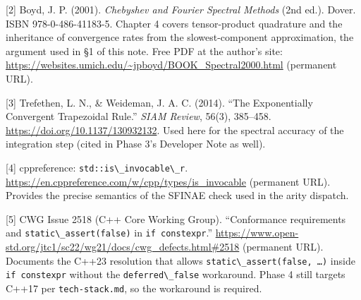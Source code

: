 {[}2{]} Boyd, J. P. (2001). \emph{Chebyshev and Fourier Spectral
Methods} (2nd ed.). Dover. ISBN 978-0-486-41183-5. Chapter 4 covers
tensor-product quadrature and the inheritance of convergence rates from
the slowest-component approximation, the argument used in §1 of this
note. Free PDF at the author's site:
\url{https://websites.umich.edu/~jpboyd/BOOK_Spectral2000.html}
(permanent URL).

{[}3{]} Trefethen, L. N., \& Weideman, J. A. C. (2014). ``The
Exponentially Convergent Trapezoidal Rule.'' \emph{SIAM Review}, 56(3),
385--458. \url{https://doi.org/10.1137/130932132}. Used here for the
spectral accuracy of the integration step (cited in Phase 3's Developer
Note as well).

{[}4{]} cppreference: \passthrough{\lstinline!std::is\_invocable\_r!}.
\url{https://en.cppreference.com/w/cpp/types/is_invocable} (permanent
URL). Provides the precise semantics of the SFINAE check used in the
arity dispatch.

{[}5{]} CWG Issue 2518 (C++ Core Working Group). ``Conformance
requirements and \passthrough{\lstinline!static\_assert(false)!} in
\passthrough{\lstinline!if constexpr!}.''
\url{https://www.open-std.org/jtc1/sc22/wg21/docs/cwg_defects.html\#2518}
(permanent URL). Documents the C++23 resolution that allows
\passthrough{\lstinline!static\_assert(false, …)!} inside
\passthrough{\lstinline!if constexpr!} without the
\passthrough{\lstinline!deferred\_false!} workaround. Phase 4 still
targets C++17 per \passthrough{\lstinline!tech-stack.md!}, so the
workaround is required.
